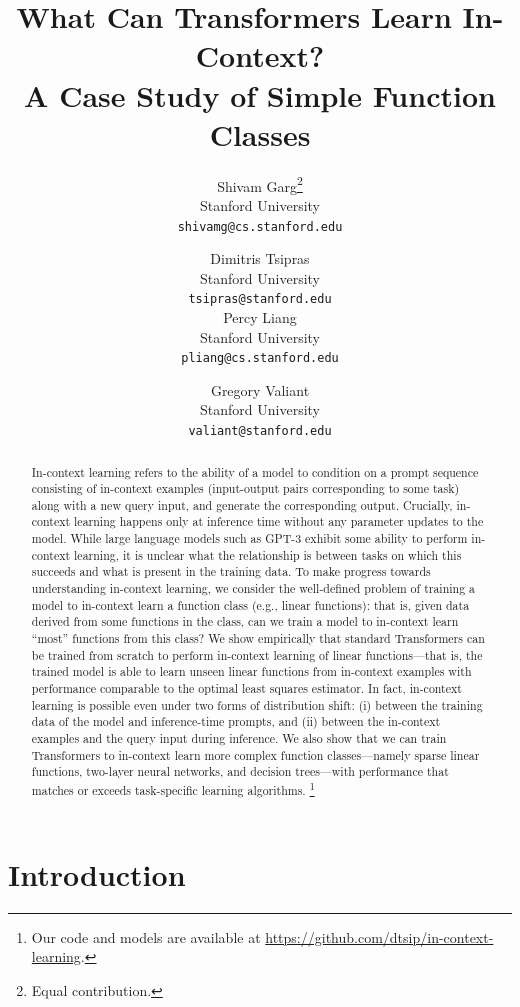 \documentclass{article}
\title{What Can Transformers Learn In-Context? \\
A Case Study of Simple Function Classes}
\date{}
\author{
  Shivam Garg\thanks{Equal contribution.} \\
  Stanford University\\
  \texttt{shivamg@cs.stanford.edu} \\
  \and
  Dimitris Tsipras\footnotemark[1] \\
  Stanford University\\
  \texttt{tsipras@stanford.edu} \\ 
  \AND
  Percy Liang\\
  Stanford University\\
  \texttt{pliang@cs.stanford.edu} \\ 
  \and
  Gregory Valiant \\
  Stanford University\\
  \texttt{valiant@stanford.edu}

  

  

  

  

  

  

  

  

  

  

}
\begin{document}
\maketitle

\begin{abstract}

In-context learning refers to the ability of a model to condition on a prompt sequence consisting of in-context examples (input-output pairs corresponding to some task) along with a new query input, and generate the corresponding output.
Crucially, in-context learning happens only at inference time without any parameter updates to the model. 
While large language models such as GPT-3 exhibit some ability to perform in-context learning, it is unclear what the relationship is between tasks on which this succeeds and what is present in the training data.
To make progress towards understanding in-context learning, we consider the well-defined problem of training a model to in-context learn a function class (e.g., linear functions): that is, given data derived from some functions in the class, can we train a model to in-context learn ``most'' functions from this class?
We show empirically that standard Transformers can be trained from scratch to perform in-context learning of linear functions---that is, the trained model is able to learn unseen linear functions from in-context examples with performance comparable to the optimal least squares estimator.
In fact, in-context learning is possible even under two forms of distribution shift: (i) between the training data of the model and inference-time prompts, and (ii) between the in-context examples and the query input during inference.
We also show that we can train Transformers to in-context learn more complex function classes---namely sparse linear functions, two-layer neural networks, and decision trees---with performance that matches or exceeds 
task-specific learning algorithms.
\footnote{Our code and models are available at \url{https://github.com/dtsip/in-context-learning}.}

\end{abstract}

\section{Introduction}
\end{document}
